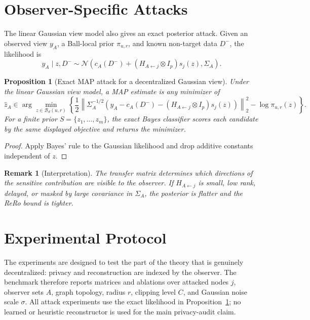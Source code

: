 \documentclass[conference,compsoc]{IEEEtran}
\newtheorem{proposition}{Proposition}
\newtheorem{remark}{Remark}
\newcommand{\N}{\mathcal{N}}
\newcommand{\cB}{\mathcal{B}}
\begin{document}
\section{Observer-Specific Attacks}
\label{sec:attacks}

The linear Gaussian view model also gives an exact posterior attack. Given an observed view $y_A$, a Ball-local prior $\pi_{u,r}$, and known non-target data $D^-$, the likelihood is
\[
y_A\mid z,D^-
\sim
\N\left(c_A(D^-)+(H_{A\leftarrow j}\otimes I_p)s_j(z),\Sigma_A\right).
\]

\begin{proposition}[Exact MAP attack for a decentralized Gaussian view]
\label{prop:map}
Under the linear Gaussian view model, a MAP estimate is any minimizer of
\[
\widehat z_A\in
\arg\min_{z\in\cB_d(u,r)}
\left\{
\frac12
\left\|
\Sigma_A^{-1/2}
\left(y_A-c_A(D^-)-(H_{A\leftarrow j}\otimes I_p)s_j(z)\right)
\right\|_2^2
-
\log\pi_{u,r}(z)
\right\}.
\]
For a finite prior $S=\{z_1,\ldots,z_m\}$, the exact Bayes classifier scores each candidate by the same displayed objective and returns the minimizer.
\end{proposition}

\begin{proof}
Apply Bayes' rule to the Gaussian likelihood and drop additive constants independent of $z$.
\end{proof}

\begin{remark}[Interpretation]
The transfer matrix determines which directions of the sensitive contribution are visible to the observer. If $H_{A\leftarrow j}$ is small, low rank, delayed, or masked by large covariance in $\Sigma_A$, the posterior is flatter and the ReRo bound is tighter.
\end{remark}


\section{Experimental Protocol}
\label{sec:experiments}

The experiments are designed to test the part of the theory that is genuinely decentralized: privacy and reconstruction are indexed by the observer.  The benchmark therefore reports matrices and ablations over attacked nodes $j$, observer sets $A$, graph topology, radius $r$, clipping level $C$, and Gaussian noise scale $\sigma$.  All attack experiments use the exact likelihood in Proposition~\ref{prop:map}; no learned or heuristic reconstructor is used for the main privacy-audit claim.
\end{document}
